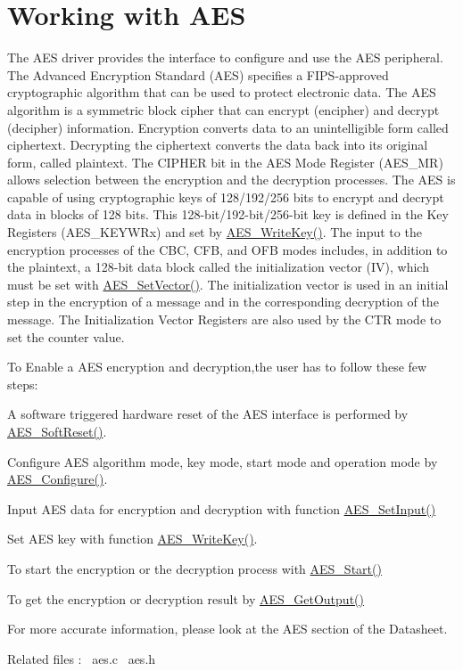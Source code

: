 \hypertarget{group__aes__module}{}\section{Working with A\+ES}
\label{group__aes__module}
The A\+ES driver provides the interface to configure and use the A\+ES peripheral. ~\newline
 The Advanced Encryption Standard (A\+ES) specifies a F\+I\+P\+S-\/approved cryptographic algorithm that can be used to protect electronic data. The A\+ES algorithm is a symmetric block cipher that can encrypt (encipher) and decrypt (decipher) information. Encryption converts data to an unintelligible form called ciphertext. Decrypting the ciphertext converts the data back into its original form, called plaintext. The C\+I\+P\+H\+ER bit in the A\+ES Mode Register (A\+E\+S\+\_\+\+MR) allows selection between the encryption and the decryption processes. The A\+ES is capable of using cryptographic keys of 128/192/256 bits to encrypt and decrypt data in blocks of 128 bits. This 128-\/bit/192-\/bit/256-\/bit key is defined in the Key Registers (A\+E\+S\+\_\+\+K\+E\+Y\+W\+Rx) and set by \mbox{\hyperlink{aes_8c_a02f0598ac0639f2511693f71a0017ba5}{A\+E\+S\+\_\+\+Write\+Key()}}. The input to the encryption processes of the C\+BC, C\+FB, and O\+FB modes includes, in addition to the plaintext, a 128-\/bit data block called the initialization vector (IV), which must be set with \mbox{\hyperlink{aes_8c_a4f27098030fb147824d3a0ec2d257c66}{A\+E\+S\+\_\+\+Set\+Vector()}}. The initialization vector is used in an initial step in the encryption of a message and in the corresponding decryption of the message. The Initialization Vector Registers are also used by the C\+TR mode to set the counter value.

To Enable a A\+ES encryption and decryption,the user has to follow these few steps\+: 
\begin{DoxyItemize}
\item A software triggered hardware reset of the A\+ES interface is performed by \mbox{\hyperlink{aes_8c_a12d287be5336020ea028ac7faa71d36b}{A\+E\+S\+\_\+\+Soft\+Reset()}}. 
\item Configure A\+ES algorithm mode, key mode, start mode and operation mode by \mbox{\hyperlink{aes_8c_a028d9abafa464c66b4f8fec4bc4f2908}{A\+E\+S\+\_\+\+Configure()}}.  
\item Input A\+ES data for encryption and decryption with function \mbox{\hyperlink{aes_8c_afb9cf6a62eda11e8ba589f5dda812384}{A\+E\+S\+\_\+\+Set\+Input()}}  
\item Set A\+ES key with function \mbox{\hyperlink{aes_8c_a02f0598ac0639f2511693f71a0017ba5}{A\+E\+S\+\_\+\+Write\+Key()}}.  
\item To start the encryption or the decryption process with \mbox{\hyperlink{aes_8c_a720cdf5e01d7bebdb2fd35471eaf3e81}{A\+E\+S\+\_\+\+Start()}} 
\item To get the encryption or decryption result by \mbox{\hyperlink{aes_8c_a4547454525b6f4b02390f80d0e821459}{A\+E\+S\+\_\+\+Get\+Output()}}  
\end{DoxyItemize}

For more accurate information, please look at the A\+ES section of the Datasheet.

Related files \+:~\newline
aes.\+c~\newline
 aes.\+h~\newline
 